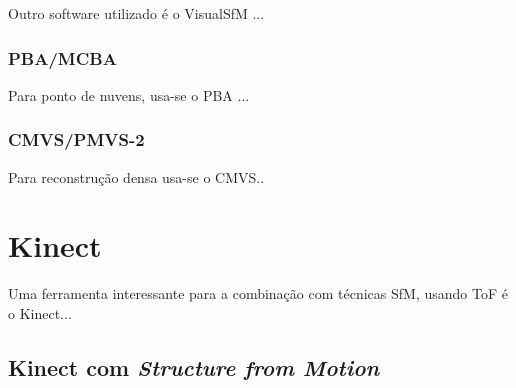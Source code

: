 \documentclass[table, usenames, svgnames, xcolor=dvipsnames]{beamer}
\begin{document}
\begin{frame} 
	\begin{center}
Outro software utilizado é o VisualSfM ...
	\end{center}
\end{frame}

\subsubsection{PBA/MCBA}

\begin{frame} 
	\begin{center}
Para ponto de nuvens, usa-se o PBA ...
	\end{center}
\end{frame}

\subsubsection{CMVS/PMVS-2}

\begin{frame} 
	\begin{center}
Para reconstrução densa usa-se o CMVS..
	\end{center}
\end{frame}

\section{Kinect}

\begin{frame}
	\begin{center}
    	Uma ferramenta interessante para a combinação com técnicas SfM, usando ToF é o Kinect...
	\end{center}
\end{frame}

\subsection{Kinect com \emph{Structure from Motion}}
\end{document}
